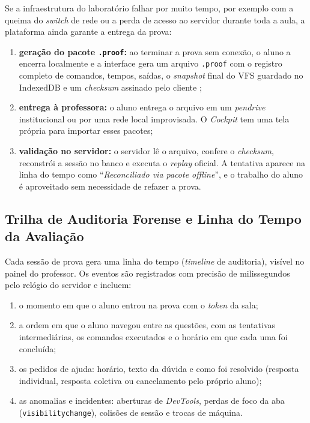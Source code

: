 Se a infraestrutura do laboratório falhar por muito tempo, por exemplo com a queima do \textit{switch} de rede ou a perda de acesso ao servidor durante toda a aula, a plataforma ainda garante a entrega da prova:

\begin{enumerate}
    \item \textbf{geração do pacote \texttt{.proof}:} ao terminar a prova sem conexão, o aluno a encerra localmente e a interface gera um arquivo \texttt{.proof} com o registro completo de comandos, tempos, saídas, o \textit{snapshot} final do VFS guardado no IndexedDB \cite{w3c2015indexeddb} e um \textit{checksum} assinado pelo cliente \cite{stallings2017crypto};
    \item \textbf{entrega à professora:} o aluno entrega o arquivo em um \textit{pendrive} institucional ou por uma rede local improvisada. O \textit{Cockpit} tem uma tela própria para importar esses pacotes;
    \item \textbf{validação no servidor:} o servidor lê o arquivo, confere o \textit{checksum}, reconstrói a sessão no banco e executa o \textit{replay} oficial. A tentativa aparece na linha do tempo como ``\textit{Reconciliado via pacote offline}'', e o trabalho do aluno é aproveitado sem necessidade de refazer a prova.
\end{enumerate}

\subsection{Trilha de Auditoria Forense e Linha do Tempo da Avaliação}
\label{sec:timeline-forense}

Cada sessão de prova gera uma linha do tempo (\textit{timeline} de auditoria), visível no painel do professor. Os eventos são registrados com precisão de milissegundos pelo relógio do servidor e incluem:

\begin{enumerate}
    \item o momento em que o aluno entrou na prova com o \textit{token} da sala;
    \item a ordem em que o aluno navegou entre as questões, com as tentativas intermediárias, os comandos executados e o horário em que cada uma foi concluída;
    \item os pedidos de ajuda: horário, texto da dúvida e como foi resolvido (resposta individual, resposta coletiva ou cancelamento pelo próprio aluno);
    \item as anomalias e incidentes: aberturas de \textit{DevTools}, perdas de foco da aba (\texttt{visibilitychange}), colisões de sessão e trocas de máquina.
\end{enumerate}

